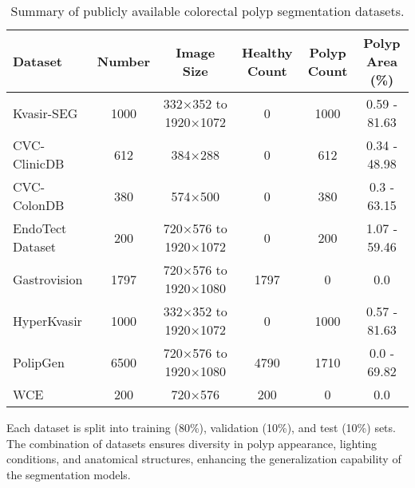 \begin{table}[htbp]
    \centering
    \caption{Summary of publicly available colorectal polyp segmentation datasets.}
    \label{tab:datasets}
    \begin{tabular}{|l|c|c|c|c|c|}
        \hline
        \textbf{Dataset} & \textbf{Number} & \textbf{Image Size} & \textbf{Healthy Count} & \textbf{Polyp Count} & \textbf{Polyp Area (\%)} \\
        \hline
        Kvasir-SEG & 1000 & 332×352 to 1920×1072 & 0 & 1000 & 0.59 - 81.63 \\
        CVC-ClinicDB & 612 & 384×288 & 0 & 612 & 0.34 - 48.98 \\
        CVC-ColonDB & 380 & 574×500 & 0 & 380 & 0.3 - 63.15 \\
        EndoTect Dataset & 200 & 720×576 to 1920×1072 & 0 & 200 & 1.07 - 59.46 \\
        Gastrovision & 1797 & 720×576 to 1920×1080 & 1797 & 0 & 0.0 \\
        HyperKvasir & 1000 & 332×352 to 1920×1072 & 0 & 1000 & 0.57 - 81.63 \\
        PolipGen & 6500 & 720×576 to 1920×1080 & 4790 & 1710 & 0.0 - 69.82 \\
        WCE & 200 & 720×576 & 200 & 0 & 0.0 \\
        \hline
    \end{tabular}
\end{table}

Each dataset is split into training (80\%), validation (10\%), and test (10\%) sets. The combination of datasets ensures diversity in polyp appearance, lighting conditions, and anatomical structures, enhancing the generalization capability of the segmentation models.




